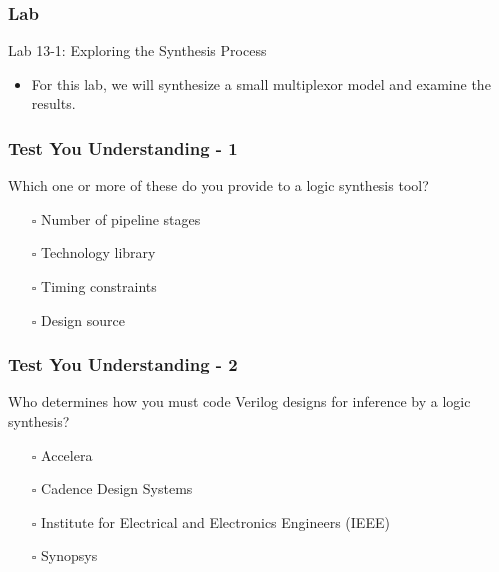 \documentclass[t, notes, xcolor=table]{beamer}
\begin{document}
\begin{frame}
\frametitle{Lab}
Lab 13-1: Exploring the Synthesis Process
\begin{itemize}
\item For this lab, we will synthesize a small multiplexor model and examine the results.
\end{itemize}
\end{frame}



\begin{frame}
\frametitle{Test You Understanding - 1}
Which one or more of these do you provide to a logic synthesis tool?
\begin{itemize}
\item[$\square$] Number of pipeline stages
\item[$\square$] Technology library
\item[$\square$] Timing constraints
\item[$\square$] Design source
\end{itemize}
\end{frame}

\begin{frame}
\frametitle{Test You Understanding - 2}
Who determines how you must code Verilog designs for inference by a logic synthesis?
\begin{itemize}
\item[$\square$] Accelera
\item[$\square$] Cadence Design Systems
\item[$\square$] Institute for Electrical and Electronics Engineers (IEEE)
\item[$\square$] Synopsys
\end{itemize}
\end{frame}
\end{document}
